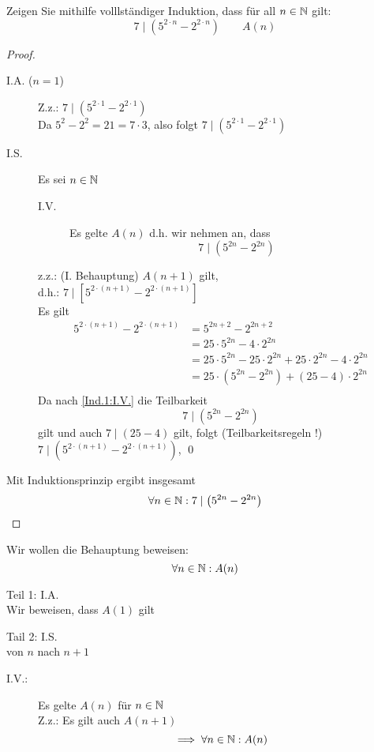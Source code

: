 \documentclass{myclass}
\begin{document}
\begin{task}
	Zeigen Sie mithilfe volllständiger Induktion, dass für all $n \in \mathbb{N} $ gilt:
	\[ 7 \mid \left( 5^{2 \cdot n} - 2^{2 \cdot n} \right) \qquad A(n) \]
	\begin{proof}
		\begin{description}
			\item[I.A. ($n = 1$)] Z.z.: $ 7 \mid \left( 5^{2 \cdot 1} - 2^{2 \cdot 1} \right) $\\
				Da $ 5^2 - 2^2 = 21 = 7 \cdot 3 $, also folgt $ 7 \mid \left( 5^{2 \cdot 1} - 2^{2 \cdot 1} \right) $
			\item[I.S.] Es sei $ n \in \mathbb{N} $
				\begin{description}
					\item[I.V.] \label{Ind.1:I.V.} Es gelte $ A(n) $ d.h. wir nehmen an, dass
						\[ 7 \mid \left( 5^{2n} - 2^{2n} \right) \]
				\end{description}
				z.z.: (I. Behauptung) $ A( n + 1 ) $ gilt,\\
				d.h.: $ 7 \mid \left[ 5^{2 \cdot ( n + 1 )} - 2^{2 \cdot ( n + 1 )} \right] $\\
				Es gilt
				\begin{align*}
					5^{2 \cdot ( n + 1 )} - 2^{2 \cdot ( n + 1 )} &= 5^{2n + 2} - 2^{2n + 2}\\
						~&= 25 \cdot 5^{2n} - 4 \cdot 2^{2n}\\
						~&= 25 \cdot 5^{2n} - 25 \cdot 2^{2n} + 25 \cdot 2^{2n} - 4 \cdot 2^{2n}\\
						~&= 25 \cdot \left( 5^{2n} - 2^{2n} \right) + ( 25 - 4 ) \cdot 2^{2n}\\
				\end{align*}
				Da nach \ref{Ind.1:I.V.} die Teilbarkeit
				\[ 7 \mid \left( 5^{2n} - 2^{2n} \right) \]
				gilt und auch $ 7 \mid (25 - 4) $ gilt, folgt (Teilbarkeitsregeln !) $ 7 \mid \left( 5^{2 \cdot ( n + 1 )} - 2^{2 \cdot ( n + 1 )} \right) $, \qed
		\end{description}
		Mit Induktionsprinzip ergibt insgesamt
		\[ \forall n \in \mathbb{N} : 7 \mid \left( 5^{2n} - 2^{2n} \right) \]
	\end{proof}
\end{task}

\begin{definition}
	Wir wollen die Behauptung beweisen:
	\[ \forall n \in \mathbb{N} : A(n) \]\par
	Teil 1: I.A.\\
	Wir beweisen, dass $ A(1) $ gilt\par
	Tail 2: I.S.\\
	von $ n $ nach $ n + 1 $
	\begin{description}
		\item[I.V.:] Es gelte $ A(n) $ für $ n \in \mathbb{N} $\\
			Z.z.: Es gilt auch $ A( n + 1 ) $
			\[ \implies \forall n \in \mathbb{N} : A(n) \]
	\end{description}
\end{definition}
\end{document}
